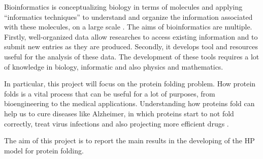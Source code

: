 Bioinformatics is conceptualizing biology in terms of molecules and applying ``informatics techniques'' to understand and organize the information associated with these molecules, on a large scale \cite{bioinfo}.
The aims of bioinformatics are multiple.
Firstly, well-organized data allow researches to access existing information and to submit new entries as they are produced.
Secondly, it develops tool and resources useful for the analysis of these data.
The development of these tools requires a lot of knowledge in biology, informatic and also physics and mathematics.

In particular, this project will focus on the protein folding problem.
How protein folds is a vital process that can be useful for a lot of purposes, from bioengineering to the medical applications.
Understanding how proteins fold can help us to cure diseases like Alzheimer, in which proteins start to not fold correctly, treat virus infections and also projecting more efficient drugs \cite{PERM}. 

The aim of this project is to report the main results in the developing of the HP model for protein folding.